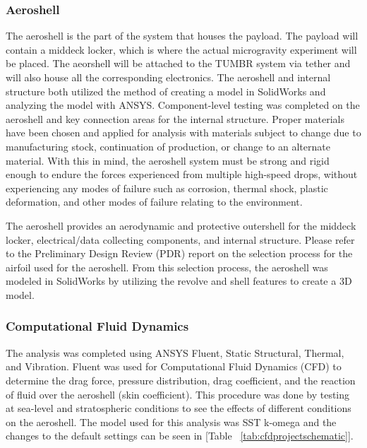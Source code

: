 \subsubsection{Aeroshell}

\indent\indent The aeroshell is the part of the system that houses the payload. The payload will contain a middeck locker, which is where the actual microgravity experiment will be placed. The aeorshell will be attached to the TUMBR system via tether and will also house all the corresponding electronics. The aeroshell and internal structure both utilized the method of creating a model in SolidWorks and analyzing the model with ANSYS. Component-level testing was completed on the aeroshell and key connection areas for the internal structure. Proper materials have been chosen and applied for analysis with materials subject to change due to manufacturing stock, continuation of production, or change to an alternate material. With this in mind, the aeroshell system must be strong and rigid enough to endure the forces experienced from multiple high-speed drops, without experiencing any modes of failure such as corrosion, thermal shock, plastic deformation, and other modes of failure relating to the environment.

\indent\indent The aeroshell provides an aerodynamic and protective outershell for the middeck locker, electrical/data collecting components, and internal structure. Please refer to the Preliminary Design Review (PDR) report on the selection process for the airfoil used for the aeroshell. From this selection process, the aeroshell was modeled in SolidWorks by utilizing the revolve and shell features to create a 3D model. 

\subsubsection*{Computational Fluid Dynamics}
\indent\indent The analysis was completed using ANSYS Fluent, Static Structural, Thermal, and Vibration. Fluent was used for Computational Fluid Dynamics (CFD) to determine the drag force, pressure distribution, drag coefficient, and the reaction of fluid over the aeroshell (skin coefficient). This procedure was done by testing at sea-level and stratospheric conditions to see the effects of different conditions on the aeroshell. The model used for this analysis was SST k-omega and the changes to the default settings can be seen in [Table ~\ref{tab:cfdprojectschematic}].

